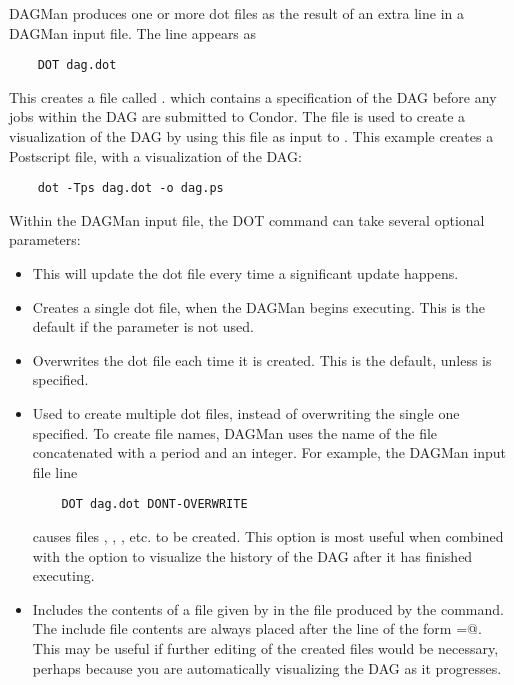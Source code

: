 DAGMan produces one or more dot files as the result of
an extra line
in a DAGMan input file. 
The line appears as
\begin{verbatim}
    DOT dag.dot
\end{verbatim}

This creates a file called .
which contains
a specification of the DAG before any jobs within the DAG
are submitted to Condor.
The  file is used to create a visualization
of the DAG by using this file as input to .
This example creates a Postscript file, with a visualization of the DAG:

\begin{verbatim}
    dot -Tps dag.dot -o dag.ps
\end{verbatim}

Within the DAGMan input file,
the DOT command can take several optional parameters:

\begin{itemize}

\item {}  This will update the dot file every time a
significant update happens. 

\item {} Creates a single dot file, when
the DAGMan begins executing. This is the default if the parameter
 is not used.

\item {} Overwrites the dot file each time it
is created. This is the default, unless 
is specified.

\item {} Used to create multiple dot files, instead
of overwriting the single one specified.
To create file names,
DAGMan uses the name of the file concatenated with a period and an
integer. For example, the DAGMan input file line
\begin{verbatim}
    DOT dag.dot DONT-OVERWRITE
\end{verbatim}
causes files
,
,
,
etc. to be created.
This option is
most useful when combined with the  option to
visualize the history of the DAG after it has finished executing. 

\item {} Includes the contents
of a file given by  in the file produced by the
 command.
The include file contents are always placed after the line of
the form
\verb@label=@.
This may be useful if further editing of the created files would
be necessary,
perhaps because you are automatically visualizing the DAG as it
progresses. 

\end{itemize}

